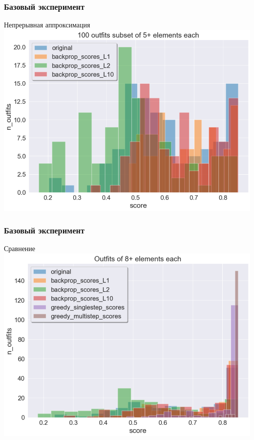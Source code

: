 \documentclass[10pt]{beamer}
\begin{document}
\begin{frame}
	\frametitle{Базовый эксперимент}
	\begin{block}{Непрерывная аппроксимация}
		\includegraphics[scale = 0.52]{figures/backprop_at_least_5_subset100.png}
	\end{block}
\end{frame}

\begin{frame}
	\frametitle{Базовый эксперимент}
	\begin{block}{Сравнение}
		\includegraphics[scale = 0.52]{figures/greedy_and_backprop_at_least_8.png}
	\end{block}
\end{frame}
\end{document}
